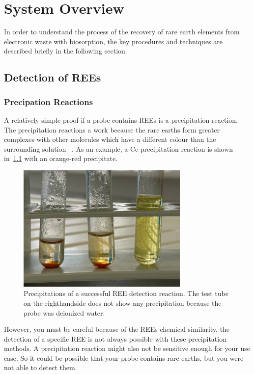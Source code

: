 \chapter{System Overview}

In order to understand the process of the recovery of rare earth elements from electronic waste with biosorption, the key procedures and techniques are described briefly in the following section.


\section{Detection of REEs\authorA}

\subsection{Precipation Reactions}
A relatively simple proof if a probe contains REEs is a precipitation reaction.
The precipitation reactions a work because the rare earths form greater complexes with other molecules which have a different colour than the surrounding solution ~\cite{janderblasius}.
As an example, a Ce precipitation reaction is shown in~\ref{fig:cer_precipitation_cropped} with an orange-red precipitate.

\begin{figure}[H]
    \centering
    \includegraphics[width=0.75\textwidth]{./media/images/ree_precipitation_reaction_cropped}
    \caption{Precipitations of a successful REE detection reaction. The test tube on the righthandside does not show any precipitation because the probe was deionized water.}
    \label{fig:cer_precipitation_cropped}
\end{figure}

However, you must be careful because of the REEs chemical similarity, the detection of a specific REE is not always possible with these precipitation methods.
A precipitation reaction might also not be sensitive enough for your use case.
So it could be possible that your probe contains rare earths, but you were not able to detect them.

